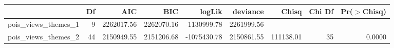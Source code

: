 \begin{table}[ht]
\centering
\begin{tabular}{lrrrrrrrr}
  \hline
 & Df & AIC & BIC & logLik & deviance & Chisq & Chi Df & Pr($>$Chisq) \\ 
  \hline
pois\_views\_themes\_1 & 9 & 2262017.56 & 2262070.16 & -1130999.78 & 2261999.56 &  &  &  \\ 
  pois\_views\_themes\_2 & 44 & 2150949.55 & 2151206.68 & -1075430.78 & 2150861.55 & 111138.01 & 35 & 0.0000 \\ 
   \hline
\end{tabular}
\end{table}
